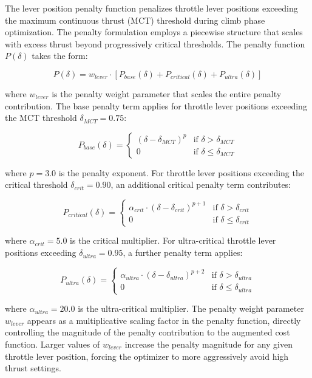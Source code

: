 The lever position penalty function penalizes throttle lever positions exceeding the maximum continuous thrust (MCT) threshold during climb phase optimization. The penalty formulation employs a piecewise structure that scales with excess thrust beyond progressively critical thresholds. The penalty function $P(\delta)$ takes the form:

\begin{equation}
P(\delta) = w_{lever} \cdot \left[ P_{base}(\delta) + P_{critical}(\delta) + P_{ultra}(\delta) \right]
\end{equation}

where $w_{lever}$ is the penalty weight parameter that scales the entire penalty contribution. The base penalty term applies for throttle lever positions exceeding the MCT threshold $\delta_{MCT} = 0.75$:

\begin{equation}
P_{base}(\delta) = \begin{cases}
(\delta - \delta_{MCT})^p & \text{if } \delta > \delta_{MCT} \\
0 & \text{if } \delta \leq \delta_{MCT}
\end{cases}
\end{equation}

where $p = 3.0$ is the penalty exponent. For throttle lever positions exceeding the critical threshold $\delta_{crit} = 0.90$, an additional critical penalty term contributes:

\begin{equation}
P_{critical}(\delta) = \begin{cases}
\alpha_{crit} \cdot (\delta - \delta_{crit})^{p+1} & \text{if } \delta > \delta_{crit} \\
0 & \text{if } \delta \leq \delta_{crit}
\end{cases}
\end{equation}

where $\alpha_{crit} = 5.0$ is the critical multiplier. For ultra-critical throttle lever positions exceeding $\delta_{ultra} = 0.95$, a further penalty term applies:

\begin{equation}
P_{ultra}(\delta) = \begin{cases}
\alpha_{ultra} \cdot (\delta - \delta_{ultra})^{p+2} & \text{if } \delta > \delta_{ultra} \\
0 & \text{if } \delta \leq \delta_{ultra}
\end{cases}
\end{equation}

where $\alpha_{ultra} = 20.0$ is the ultra-critical multiplier. The penalty weight parameter $w_{lever}$ appears as a multiplicative scaling factor in the penalty function, directly controlling the magnitude of the penalty contribution to the augmented cost function. Larger values of $w_{lever}$ increase the penalty magnitude for any given throttle lever position, forcing the optimizer to more aggressively avoid high thrust settings.
